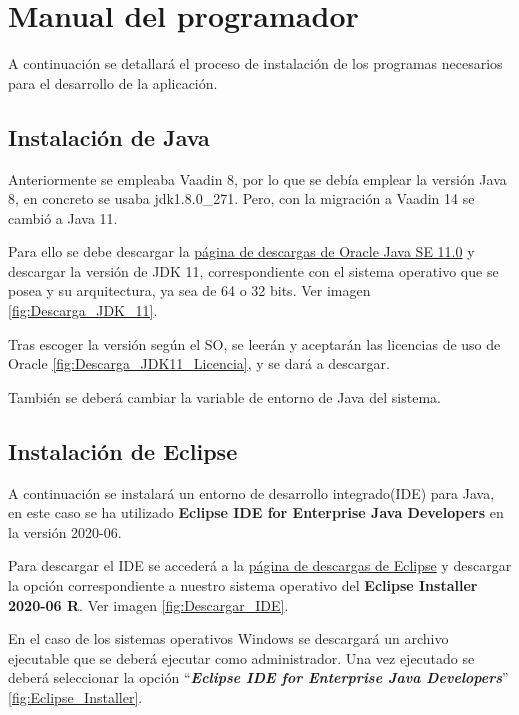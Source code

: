 \section{Manual del programador}
A continuación se detallará el proceso de instalación de los programas necesarios para el desarrollo de la aplicación.

\subsection{Instalación de Java}

Anteriormente se empleaba Vaadin 8, por lo que se debía emplear la versión Java 8, en concreto se usaba jdk1.8.0\_271. Pero, con la migración a Vaadin 14 se cambió a Java 11.
 
Para ello se debe descargar la \href{https://www.oracle.com/es/java/technologies/javase/jdk11-archive-downloads.html}{página de descargas de Oracle Java SE 11.0} y descargar la versión de JDK 11, correspondiente con el sistema operativo que se posea y su arquitectura, ya sea de 64 o 32 bits. Ver imagen \ref{fig:Descarga_JDK_11}.

Tras escoger la versión según el SO, se leerán y aceptarán las licencias de uso de Oracle \ref{fig:Descarga_JDK11_Licencia}, y se dará a descargar. 

También se deberá cambiar la variable de entorno de Java del sistema.


\subsection{Instalación de Eclipse}
A continuación se instalará un entorno de desarrollo integrado(IDE) para Java, en este caso se ha utilizado \textbf{Eclipse IDE for Enterprise Java Developers} en la versión 2020-06. 

Para descargar el IDE se accederá a la \href{https://www.eclipse.org/downloads/packages/release/2020-06/r}{página de descargas de Eclipse} y descargar la opción correspondiente a nuestro sistema operativo del \textbf{Eclipse Installer 2020-06 R}. Ver imagen \ref{fig:Descargar_IDE}.


En el caso de los sistemas operativos Windows se descargará un archivo ejecutable que se deberá ejecutar como administrador. Una vez ejecutado se deberá seleccionar la opción ``\textbf{\textit{Eclipse IDE for Enterprise Java Developers}}'' \ref{fig:Eclipse_Installer}. 

